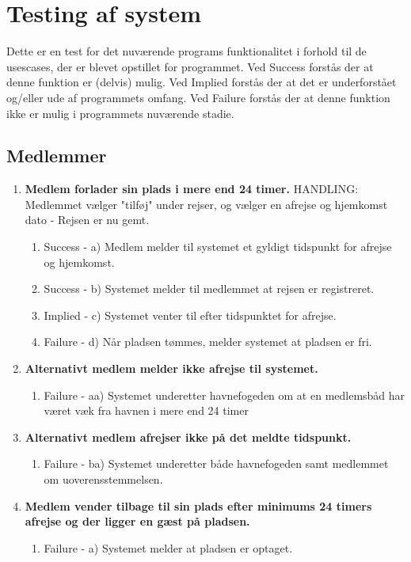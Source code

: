 
\section{Testing af system}
Dette er en test for det nuværende programs funktionalitet i forhold til de usescases, der er blevet opstillet for programmet.
Ved Success forstås der at denne funktion er (delvis) mulig.
Ved Implied forstås der at det er underforstået og/eller ude af programmets omfang.
Ved Failure forstås der at denne funktion ikke er mulig i programmets nuværende stadie.
\subsection{Medlemmer}
\begin{enumerate}
	\item{\bf{Medlem forlader sin plads i mere end 24 timer.}}
		HANDLING: Medlemmet vælger "tilføj" under rejser, og vælger en afrejse og hjemkomst dato - Rejsen er nu gemt.
	  \begin{enumerate}
			\item Success -  a) Medlem melder til systemet et gyldigt tidspunkt for afrejse og hjemkomst.
			\item Success -  b) Systemet melder til medlemmet at rejsen er registreret. 
			\item Implied -  c) Systemet venter til efter tidspunktet for afrejse.
			\item Failure -  d) Når pladsen tømmes, melder systemet at pladsen er fri.
	   \end{enumerate}
			
	\item{\bf{Alternativt medlem melder ikke afrejse til systemet.}}
	  \begin{enumerate}
			\item Failure -  aa) Systemet underetter havnefogeden om at en medlemsbåd har været væk fra havnen i mere end 24 timer
	   \end{enumerate}
	   
	\item{\bf{Alternativt medlem afrejser ikke på det meldte tidspunkt.}}
	  \begin{enumerate}
			\item Failure -  ba) Systemet underetter både havnefogeden samt medlemmet om uoverensstemmelsen.
	   \end{enumerate}
	   
	\item{\bf{Medlem vender tilbage til sin plads efter minimums 24 timers afrejse og der ligger en gæst på pladsen.}}
	  \begin{enumerate}
			\item Failure -  a) Systemet melder at pladsen er optaget.
	   \end{enumerate}
	   

\end{enumerate}
